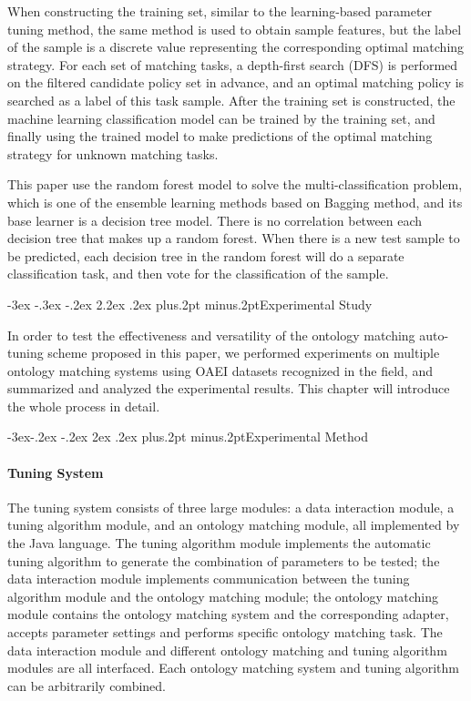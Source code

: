 \documentclass[twoside]{article}
\makeatletter
\def\section{\@startsection{section}{1}{\z@}%
 {-3ex \@plus -.3ex \@minus -.2ex}%
 {2.2ex \@plus.2ex}%
{\normalfont\normalsize\protect\baselineskip=14.5pt plus.2pt minus.2pt\bfseries}}
\def\subsection{\@startsection{subsection}{2}{\z@}%
 {-3ex\@plus -.2ex \@minus -.2ex}%
 {2ex \@plus.2ex}%
{\normalfont\normalsize\protect\baselineskip=12.5pt plus.2pt minus.2pt\bfseries}}
\makeatother
\begin{document}
\begin{multicols}{2}
When constructing the training set, similar to the learning-based parameter tuning method, the same method is used to obtain sample features, but the label of the sample is a discrete value representing the corresponding optimal matching strategy.
For each set of matching tasks, a depth-first search (DFS) is performed on the filtered candidate policy set in advance, and an optimal matching policy is searched as a label of this task sample.
After the training set is constructed, the machine learning classification model can be trained by the training set, and finally using the trained model to make predictions of the optimal matching strategy for unknown matching tasks.

This paper use the random forest model to solve the multi-classification problem, which is one of the ensemble learning methods based on Bagging method, and its base learner is a decision tree model.
There is no correlation between each decision tree that makes up a random forest. 
When there is a new test sample to be predicted, each decision tree in the random forest will do a separate classification task, and then vote for the classification of the sample.



\section{Experimental Study}

In order to test the effectiveness and versatility of the ontology matching auto-tuning scheme proposed in this paper, we performed experiments on multiple ontology matching systems using OAEI datasets recognized in the field, and summarized and analyzed the experimental results. This chapter will introduce the whole process in detail.

\subsection{Experimental Method}
\paragraph{Tuning System}
The tuning system consists of three large modules: a data interaction module, a tuning algorithm module, and an ontology matching module, all implemented by the Java language. 
The tuning algorithm module implements the automatic tuning algorithm to generate the combination of parameters to be tested; the data interaction module implements communication between the tuning algorithm module and the ontology matching module; the ontology matching module contains the ontology matching system and the corresponding adapter, accepts parameter settings and performs specific ontology matching task. 
The data interaction module and different ontology matching and tuning algorithm modules are all interfaced. Each ontology matching system and tuning algorithm can be arbitrarily combined.



\end{multicols}
\end{document}
